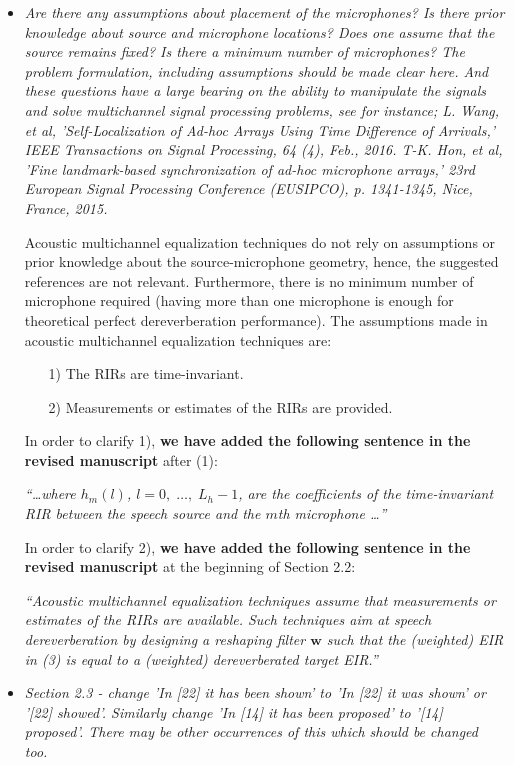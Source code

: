 \documentclass[10pt, a4paper]{article}
\begin{document}
\begin{itemize}
\item {\textit{Are there any assumptions about placement of the microphones? Is there prior knowledge about source and microphone locations? Does one assume that the source remains fixed? Is there a minimum number of microphones? The problem formulation, including assumptions should be made clear here. And these questions have a large bearing on the ability to manipulate the signals and solve multichannel signal processing problems, see for instance;
L. Wang, et al, 'Self-Localization of Ad-hoc Arrays Using Time Difference of Arrivals,' IEEE Transactions on Signal Processing, 64 (4), Feb., 2016.
T-K. Hon, et al, 'Fine landmark-based synchronization of ad-hoc microphone arrays,' 23rd European Signal Processing Conference (EUSIPCO), p. 1341-1345, Nice, France, 2015. }}

Acoustic multichannel equalization techniques do not rely on assumptions or prior knowledge about the source-microphone geometry, hence, the suggested references are not relevant.
Furthermore, there is no minimum number of microphone required (having more than one microphone is enough for theoretical perfect dereverberation performance). 
The assumptions made in acoustic multichannel equalization techniques are:
\begin{itemize}
\item [1)] The RIRs are time-invariant.
\item [2)] Measurements or estimates of the RIRs are provided.
\end{itemize}
In order to clarify 1), {\textbf{we have added the following sentence in the revised manuscript}} after (1):

{\emph{``\ldots where $h_m(l)$, $l = 0, \; \ldots, \; L_h-1$, are the coefficients of the time-invariant RIR between the speech source and the $m$th microphone \ldots'' }}

In order to clarify 2), {\textbf{we have added the following sentence in the revised manuscript}} at the beginning of Section 2.2:

{\emph{``Acoustic multichannel equalization techniques assume that measurements or estimates of the RIRs are available. 
Such techniques aim at speech dereverberation by designing a reshaping filter $\mathbf{w}$ such that the (weighted) EIR in (3) is equal to a (weighted) dereverberated target EIR.''}}


\item {\textit{Section 2.3 - change 'In [22] it has been shown' to 'In [22] it was shown' or '[22] showed'. Similarly change 'In [14] it has been proposed' to '[14] proposed'. There may be other occurrences of this which should be changed too.}}


\end{itemize}
\end{document}
